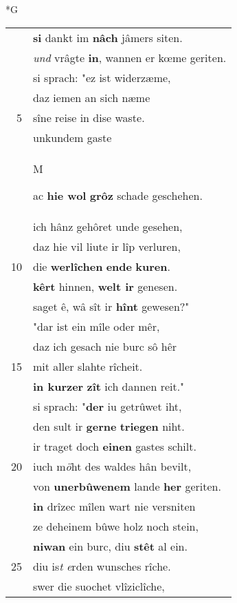 \documentclass[8pt,a4paper,notitlepage]{article}
\begin{document}
\begin{table}[ht]
\begin{minipage}[t]{0.5\linewidth}
\small
\begin{center}*G
\end{center}
\begin{tabular}{rl}
 & \textbf{si} dankt im \textbf{nâch} jâmers siten.\\ 
 & \textit{und} vrâgte \textbf{in}, wannen er kœme geriten.\\ 
 & si sprach: "ez ist widerzæme,\\ 
 & daz iemen an sich næme\\ 
5 & sîne reise in dise waste.\\ 
 & unkundem gaste\\ 
 & \begin{large}M\end{large}ac \textbf{hie wol} \textbf{grôz} schade geschehen.\\ 
 & ich hânz gehôret unde gesehen,\\ 
 & daz hie vil liute ir lîp verluren,\\ 
10 & die \textbf{werlîchen} \textbf{ende} \textbf{kuren}.\\ 
 & \textbf{kêrt} hinnen, \textbf{welt ir} genesen.\\ 
 & saget ê, wâ sît ir \textbf{hînt} gewesen?"\\ 
 & "dar ist ein mîle oder mêr,\\ 
 & daz ich gesach nie burc sô hêr\\ 
15 & mit aller slahte rîcheit.\\ 
 & \textbf{in kurzer} \textbf{zît} ich dannen reit."\\ 
 & si sprach: "\textbf{der} iu getrûwet iht,\\ 
 & den sult ir \textbf{gerne} \textbf{triegen} niht.\\ 
 & ir traget doch \textbf{einen} gastes schilt.\\ 
20 & iuch m\textit{ö}ht des waldes hân bevilt,\\ 
 & von \textbf{unerbûwenem} lande \textbf{her} geriten.\\ 
 & \textbf{in} drîzec mîlen wart nie versniten\\ 
 & ze deheinem bûwe holz noch stein,\\ 
 & \textbf{niwan} ein burc, diu \textbf{stêt} al ein.\\ 
25 & diu is\textit{t} \textit{e}rden wunsches rîche.\\ 
 & swer die suochet vlîziclîche,\\ 

\end{tabular}
\end{minipage}
\end{table}
\end{document}
